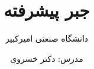 \documentclass[notheorems,aspectratio=1610,t]{beamer}
\title{جبر پیشرفته}
\subtitle{دانشگاه صنعتی امیرکبیر}
\author{مدرس: دکتر خسروی}
\date{}
\begin{document}
\small
\begin{frame}
  \titlepage
\end{frame}
\ifdefined\AlgebraLectureNumber
  \setcounter{section}{\numexpr\AlgebraLectureNumber-1\relax}
  
\else
  
\fi
\end{document}
